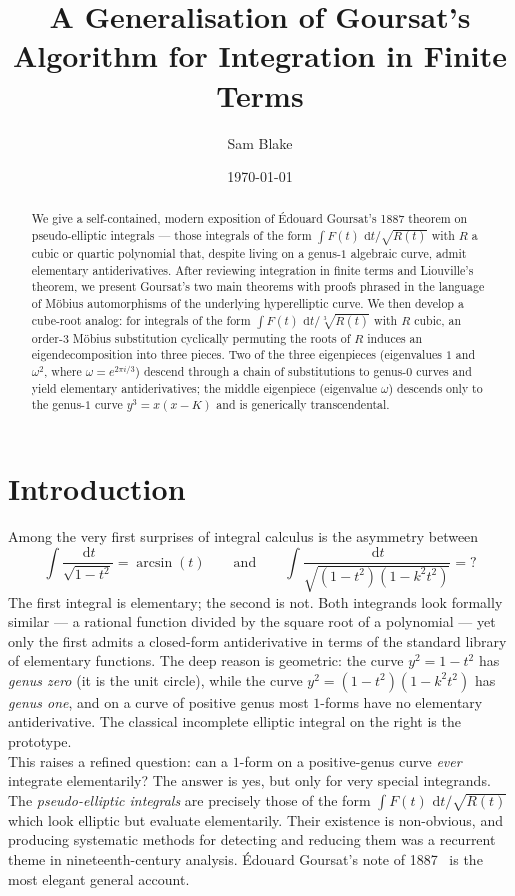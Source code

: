 \documentclass[11pt,a4paper]{article}
\title{\textbf{A Generalisation of Goursat's Algorithm for Integration in Finite Terms}}
\author{Sam Blake}
\date{\today}
\theoremstyle{plain}
\theoremstyle{definition}
\theoremstyle{remark}
\renewcommand{\d}{\,\mathrm{d}}
\begin{document}
\maketitle

\begin{abstract}
We give a self-contained, modern exposition of \'Edouard Goursat's 1887 theorem on pseudo-elliptic integrals --- those integrals of the form $\int F(t)\,\d t/\sqrt{R(t)}$ with $R$ a cubic or quartic polynomial that, despite living on a genus-$1$ algebraic curve, admit elementary antiderivatives. After reviewing integration in finite terms and Liouville's theorem, we present Goursat's two main theorems with proofs phrased in the language of M\"obius automorphisms of the underlying hyperelliptic curve. We then develop a cube-root analog: for integrals of the form $\int F(t)\,\d t/\sqrt[3]{R(t)}$ with $R$ cubic, an order-$3$ M\"obius substitution cyclically permuting the roots of $R$ induces an eigendecomposition into three pieces. Two of the three eigenpieces (eigenvalues $1$ and $\omega^2$, where $\omega = e^{2\pi i/3}$) descend through a chain of substitutions to genus-$0$ curves and yield elementary antiderivatives; the middle eigenpiece (eigenvalue $\omega$) descends only to the genus-$1$ curve $y^3 = x(x-K)$ and is generically transcendental. 
\end{abstract}

\section{Introduction}
\label{sec:intro}

Among the very first surprises of integral calculus is the asymmetry between
\[
  \int \frac{\d t}{\sqrt{1-t^2}} = \arcsin(t)
\qquad\text{and}\qquad
  \int \frac{\d t}{\sqrt{(1-t^2)(1-k^2t^2)}} = ?
\]
The first integral is elementary; the second is not. Both integrands look formally similar --- a rational function divided by the square root of a polynomial --- yet only the first admits a closed-form antiderivative in terms of the standard library of elementary functions. The deep reason is geometric: the curve $y^2 = 1 - t^2$ has \emph{genus zero} (it is the unit circle), while the curve $y^2 = (1-t^2)(1-k^2 t^2)$ has \emph{genus one}, and on a curve of positive genus most $1$-forms have no elementary antiderivative. The classical incomplete elliptic integral on the right is the prototype.\\

This raises a refined question: can a $1$-form on a positive-genus curve \emph{ever} integrate elementarily? The answer is yes, but only for very special integrands. The \emph{pseudo-elliptic integrals} are precisely those of the form $\int F(t)\,\d t/\sqrt{R(t)}$ which look elliptic but evaluate elementarily. Their existence is non-obvious, and producing systematic methods for detecting and reducing them was a recurrent theme in nineteenth-century analysis. \'Edouard Goursat's note of 1887~\cite{Goursat1887} is the most elegant general account.\\
\end{document}
